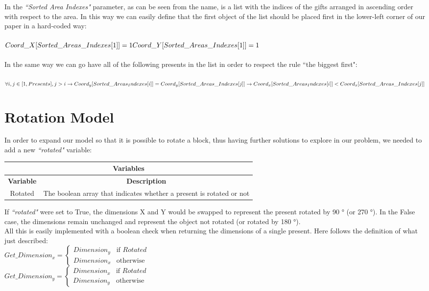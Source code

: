 In the \textit{``Sorted Area Indexes"} parameter, as can be seen from the name, is a list with the indices of the gifts arranged in ascending order with respect to the area.
In this way we can easily define that the first object of the list should be placed first in the lower-left corner of our paper in a hard-coded way:\\ \\
$
Coord\_X[Sorted\_Areas\_Indexes[1]] = 1\\
Coord\_Y[Sorted\_Areas\_Indexes[1]] = 1
$
\\ \\
In the same way we can go have all of the following presents in the list in order to respect the rule ``the biggest first":\\ \\
$
\forall i, j \in [1, Presents], j > i \rightarrow \\
Coord_y[Sorted\_Areas_Indexes[i]] = Coord_y[Sorted\_Areas\_Indexes[j]] \rightarrow \\
Coord_x[Sorted\_Areas_Indexes[i]] < Coord_x[Sorted\_Areas\_Indexes[j]]
$
\\





\section{Rotation Model}
In order to expand our model so that it is possible to rotate a block, thus having further solutions to explore in our problem, we needed to add a new \textit{``rotated"} variable:
\begin{center}
		\begin{tabular}{|c|c|}
			\hline
			\multicolumn{2}{|c|}{\textbf{Variables}} \\
			\hline
			\textbf{Variable} & {\textbf{Description}} \\
			\hline
			Rotated & The boolean array that indicates whether a present is rotated or not \\
			\hline
		\end{tabular}
\end{center}
If \textit{``rotated"} were set to True, the dimensions X and Y would be swapped to represent the present rotated by 90 ° (or 270 °). In the False case, the dimensions remain unchanged and represent the object not rotated (or rotated by 180 °). \\
All this is easily implemented with a boolean check when returning the dimensions of a single present.
Here follows the definition of what just described:\\
$
Get\_Dimension_x = 
\begin{cases}
	Dimension_y & \text{if } Rotated \\
	Dimension_x & \text{otherwise}
\end{cases}
$
\\
$
Get\_Dimension_y = 
\begin{cases}
	Dimension_x & \text{if } Rotated \\
	Dimension_y & \text{otherwise}
\end{cases}
$

